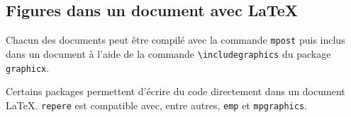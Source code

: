 \documentclass[11pt,a4paper,french]{article}
\begin{document}
\subsection{Figures dans un document avec \LaTeX}
Chacun des documents peut être compilé avec la commande \verb|mpost| puis inclus dans un document à l'aide de la commande \verb|\includegraphics| du package \verb|graphicx|.

Certains packages permettent d'écrire du code \MP{} directement dans un document \LaTeX. \verb|repere| est compatible avec, entre autres, \verb|emp| et \verb|mpgraphics|.


%
%
%
%
%
%
%
%
%
%
%
%
%
%
\end{document}
